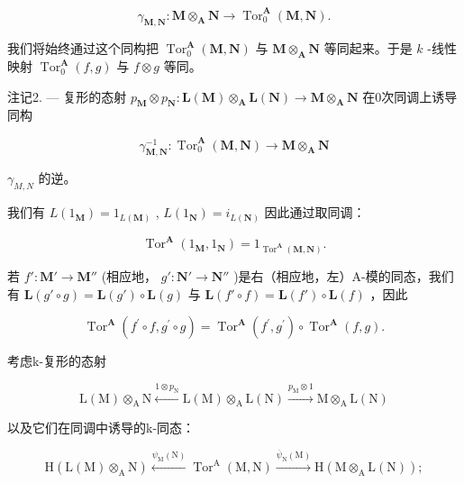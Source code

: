 \[
\gamma_ {\mathbf {M}, \mathbf {N}}: \mathbf {M} \otimes_ {\mathbf {A}} \mathbf {N} \rightarrow \operatorname{Tor} _ {0} ^ {\mathbf {A}} (\mathbf {M}, \mathbf {N}).\tag{7}
\]

我们将始终通过这个同构把 \(\operatorname{Tor}_{0}^{\mathbf{A}}(\mathbf{M},\mathbf{N})\) 与 \(\mathbf{M}\otimes_{\mathbf{A}}\mathbf{N}\) 等同起来。于是 \(k\) -线性映射 \(\operatorname{Tor}_{0}^{\mathbf{A}}(f,g)\) 与 \(f\otimes g\) 等同。

注记2. --- 复形的态射 \(p_{\mathbf{M}} \otimes p_{\mathbf{N}}: \mathbf{L}(\mathbf{M}) \otimes_{\mathbf{A}} \mathbf{L}(\mathbf{N}) \to \mathbf{M} \otimes_{\mathbf{A}} \mathbf{N}\) 在0次同调上诱导同构

\[
\gamma_ {\mathbf {M}, \mathbf {N}} ^ {- 1}: \operatorname{Tor} _ {0} ^ {\mathbf {A}} (\mathbf {M}, \mathbf {N}) \rightarrow \mathbf {M} \otimes_ {\mathbf {A}} \mathbf {N}
\]

\(\gamma_{M,N}\) 的逆。

我们有 \(L(1_{\mathbf{M}}) = 1_{L(\mathbf{M})}\) , \(L(1_{\mathbf{N}}) = i_{L(\mathbf{N})}\) 因此通过取同调：

\[
\operatorname{Tor} ^ {\mathbf {A}} \left(1 _ {\mathbf {M}}, 1 _ {\mathbf {N}}\right) = 1 _ {\operatorname{Tor} ^ {\mathbf {A}} (\mathbf {M}, \mathbf {N})}.\tag{8}
\]

若 \(f': \mathbf{M}' \to \mathbf{M}''\) (相应地， \(g': \mathbf{N}' \to \mathbf{N}''\) )是右（相应地，左）A-模的同态，我们有 \(\mathbf{L}(g' \circ g) = \mathbf{L}(g') \circ \mathbf{L}(g)\) 与 \(\mathbf{L}(f' \circ f) = \mathbf{L}(f') \circ \mathbf{L}(f)\) ，因此

\[
\operatorname{Tor} ^ {\mathbf {A}} \left(f ^ {\prime} \circ f, g ^ {\prime} \circ g\right) = \operatorname{Tor} ^ {\mathbf {A}} \left(f ^ {\prime}, g ^ {\prime}\right) \circ \operatorname{Tor} ^ {\mathbf {A}} (f, g).\tag{9}
\]

考虑k-复形的态射

\[
\mathrm{L} (\mathrm{M}) \otimes_ {\mathrm{A}} \mathrm{N} \xleftarrow {1 \otimes p _ {\mathrm{N}}} \mathrm{L} (\mathrm{M}) \otimes_ {\mathrm{A}} \mathrm{L} (\mathrm{N}) \xrightarrow {p _ {\mathrm{M}} \otimes 1} \mathrm{M} \otimes_ {\mathrm{A}} \mathrm{L} (\mathrm{N})
\]

以及它们在同调中诱导的k-同态：

\[
\mathrm{H} (\mathrm{L} (\mathrm{M}) \otimes_ {\mathrm{A}} \mathrm{N}) \xleftarrow {\psi_ {\mathrm{M}} (\mathrm{N})} \operatorname{Tor} ^ {\mathrm{A}} (\mathrm{M}, \mathrm{N}) \xrightarrow {\overline {{\psi}} _ {\mathrm{N}} (\mathrm{M})} \mathrm{H} (\mathrm{M} \otimes_ {\mathrm{A}} \mathrm{L} (\mathrm{N}));
\]

